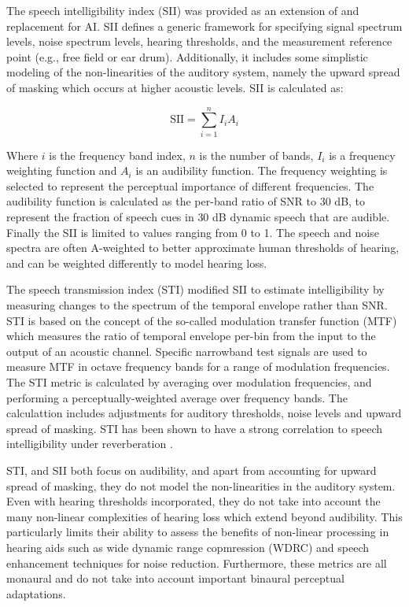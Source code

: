 The speech intelligibility index (SII) \citep{ansi1997methods} was provided as an extension of and replacement for AI. SII defines a generic framework for specifying signal spectrum levels, noise spectrum levels, hearing thresholds, and the measurement reference point (e.g., free field or ear drum). Additionally, it includes some simplistic modeling of the non-linearities of the auditory system, namely the upward spread of masking which occurs at higher acoustic levels. SII is calculated as:

\[\mathrm{SII} = \sum_{i=1}^{n}I_iA_i\]

\noindent Where $i$ is the frequency band index, $n$ is the number of bands, $I_i$ is a frequency weighting function and $A_i$ is an audibility function. The frequency weighting is selected to represent the perceptual importance of different frequencies.  The audibility function is calculated as the per-band ratio of SNR to 30 dB, to represent the fraction of speech cues in 30 dB dynamic speech that are audible. Finally the SII is limited to values ranging from 0 to 1. The speech and noise spectra are often A-weighted to better approximate human thresholds of hearing, and can be weighted differently to model hearing loss.

The speech transmission index (STI) \citep{iec2003sti} modified SII to estimate intelligibility by measuring changes to the spectrum of the temporal envelope rather than SNR. STI is based on the concept of the so-called modulation transfer function (MTF) which measures the ratio of temporal envelope per-bin from the input to the output of an acoustic channel. Specific narrowband test signals are used to measure MTF in octave frequency bands for a range of modulation frequencies. The STI metric is calculated by averaging over modulation frequencies, and performing a perceptually-weighted average over frequency bands. The calculattion includes adjustments for auditory thresholds, noise levels and upward spread of masking. STI has been shown to have a strong correlation to speech intelligibility under reverberation \citep{schepker2016perceived}.

STI, and SII both focus on audibility, and apart from accounting for upward spread of masking, they do not model the non-linearities in the auditory system. Even with hearing thresholds incorporated, they do not take into account the many non-linear complexities of hearing loss which extend beyond audibility. This particularly limits their ability to assess the benefits of non-linear processing in hearing aids such as wide dynamic range copmression (WDRC) and speech enhancement techniques for noise reduction. Furthermore, these metrics are all monaural and do not take into account important binaural perceptual adaptations.

